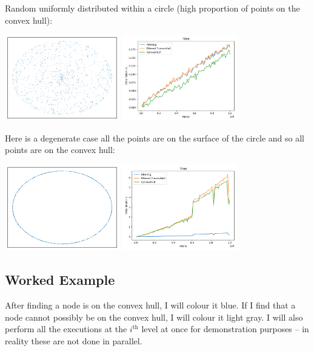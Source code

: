 \documentclass[10pt,\jkfside,a4paper]{article}
\begin{document}
\begin{enumerate}
Random uniformly distributed within a circle (high proportion of points on the convex hull):
\begin{center}
\includegraphics[width=5cm]{circle_points}
\includegraphics[width=5cm]{circleraw}
\end{center}

Here is a degenerate case all the points are on the surface of the circle and so 
all points are on the convex hull:
\begin{center}
\includegraphics[width=5cm]{circlesurface}
\includegraphics[width=5cm]{surface_points}
\end{center}

\subsection*{Worked Example}

After finding a node is on the convex hull, I will colour it blue. If I find that a node 
cannot possibly be on the convex hull, I will colour it light gray.
I will also perform all the executions at the $i^\text{th}$ level at once for demonstration 
purposes -- in reality these are not done in parallel.


\end{enumerate}
\end{document}

